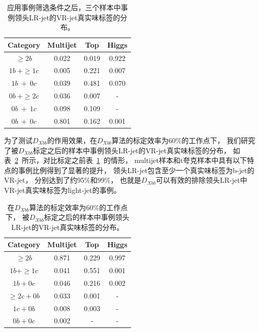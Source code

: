 \begin{table}
\begin{center}
  \begin{tabular}{ c|c c c }
    \hline
    \hline
    Category & Multijet & Top & Higgs \\
    \hline
    $\geq2b$ & 0.022 & 0.019 & 0.922 \\
    \hline
    $1b \ + \geq1c$ & 0.005 & 0.221 & 0.007 \\
    \hline
    $1b \ + \ 0c $ & 0.039 & 0.481 & 0.070 \\
    \hline
    $0b \ + \geq2c$ & 0.036 & 0.007 & - \\
    \hline
    $0b \ + \ 1c$ & 0.098 & 0.109 & - \\
    \hline
    $0b \ + \ 0c$ & 0.801 & 0.162 & 0.001 \\
    \hline
    \hline
  \end{tabular}
  \caption{
 应用事例筛选条件之后，三个样本中事例领头LR-jet的VR-jet真实味标签的分布。
  }
\label{tab:XbbPerf2}
\end{center}
\end{table}


为了测试$D_{Xbb}$的作用效果，在$D_{Xbb}$算法的标定效率为60\%的工作点下，
我们研究了被$D_{Xbb}$标定之后的样本中事例领头LR-jet的VR-jet真实味标签的分布，
如表~\ref{tab:XbbPerf3}~所示，对比标定之前表~\ref{tab:XbbPerf2}~的情形，
multijet样本和t夸克样本中具有以下特点的事例比例得到了显著的提升，
领头LR-jet包含至少一个真实味标签为b-jet的VR-jet，
分别达到了约95\%和99\%，
也就是$D_{Xbb}$可以有效的排除领头LR-jet中VR-jet真实味标签为light-jet的事例。

\begin{table}
\begin{center}
  \begin{tabular}{ c|c c c }
    \hline
    \hline
    Category & Multijet & Top & Higgs \\
    \hline
$\geq2b$ & 0.871 & 0.229 & 0.997 \\
 \hline
$1b + \geq1c$ & 0.041 & 0.551 & 0.001 \\
 \hline
$1b + 0c $ & 0.046 & 0.216 & 0.002 \\
 \hline
$\geq2c + 0b$ & 0.033 & 0.001 & - \\
 \hline
$1c + 0b$ & 0.008 & 0.003 & - \\
 \hline
$0b + 0c$ & 0.002 & - & - \\
    \hline
    \hline
  \end{tabular}
  \caption{
  在$D_{Xbb}$算法的标定效率为60\%的工作点下，
被$D_{Xbb}$标定之后的样本中事例领头LR-jet的VR-jet真实味标签的分布。
  }
  \label{tab:XbbPerf3}
  \end{center}
\end{table}

